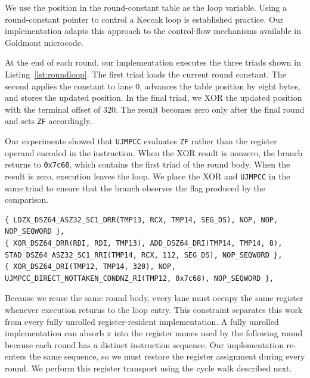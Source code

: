 \documentclass[journal=tches,submission]{iacrtrans}
\newcommand{\code}[1]{\texttt{#1}}
\newcommand{\uaddr}[1]{\texttt{0x#1}}
\begin{document}
We use the position in the round-constant table as the loop variable. 
Using a round-constant pointer to control a Keccak loop is established practice. 
Our implementation adapts this approach to the control-flow mechanisms available in Goldmont microcode.

At the end of each round, our implementation executes the three triads shown in Listing~\ref{lst:roundloop}. 
The first triad loads the current round constant. 
The second applies the constant to lane 0, advances the table position by eight bytes, and stores the updated position. 
In the final triad, we XOR the updated position with the terminal offset of 320. 
The result becomes zero only after the final round and sets \code{ZF} accordingly.

Our experiments showed that \code{UJMPCC} evaluates \code{ZF} rather than the register operand encoded in the instruction. 
When the XOR result is nonzero, the branch returns to \uaddr{7c68}, which contains the first triad of the round body. 
When the result is zero, execution leaves the loop. 
We place the XOR and \code{UJMPCC} in the same triad to ensure that the branch observes the flag produced by the comparison.

\begin{lstlisting}[caption={The three triads that close each Keccak round. Our implementation applies $\iota$, advances the round-constant position, and returns to the beginning of the round body until it consumes the final constant.},label={lst:roundloop}]
{ LDZX_DSZ64_ASZ32_SC1_DRR(TMP13, RCX, TMP14, SEG_DS), NOP, NOP, NOP_SEQWORD },
{ XOR_DSZ64_DRR(RDI, RDI, TMP13), ADD_DSZ64_DRI(TMP14, TMP14, 8),
STAD_DSZ64_ASZ32_SC1_RRI(TMP14, RCX, 112, SEG_DS), NOP_SEQWORD },
{ XOR_DSZ64_DRI(TMP12, TMP14, 320), NOP,
UJMPCC_DIRECT_NOTTAKEN_CONDNZ_RI(TMP12, 0x7c68), NOP_SEQWORD },
\end{lstlisting}

Because we reuse the same round body, every lane must occupy the same register whenever execution returns to the loop entry. 
This constraint separates this work from every fully unrolled register-resident implementation. 
A fully unrolled implementation can absorb $\pi$ into the register names used by the following round because each round has a distinct instruction sequence. 
Our implementation re-enters the same sequence, so we must restore the register assignment during every round. 
We perform this register transport using the cycle walk described next.
\end{document}
